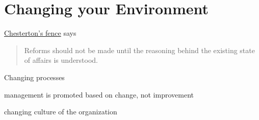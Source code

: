 \section{Changing your Environment}

\href{https://en.wikipedia.org/wiki/Wikipedia:Chesterton\%27s_fence}{Chesterton's fence} says
\begin{quote}
Reforms should not be made until the reasoning behind the existing state of affairs is understood.
\end{quote}


Changing processes

management is promoted based on change, not improvement

changing \gls{culture} of the organization